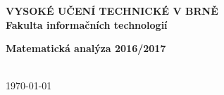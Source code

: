 \begin{titlepage}
	\centering

	{\fontsize{20pt}{15pt}\bfseries 
		VYSOKÉ UČENÍ TECHNICKÉ V BRNĚ\\
		\vspace{8pt}
		Fakulta informačních technologií
	}

	\vspace*{64pt}

	\begin{figure}[H]
		\centering
		 
	\end{figure}

	\vspace*{\fill}

	{\LARGE \bfseries Matematická analýza 2016/2017\\}
	\vspace*{4pt}
	{\Large \thetitle}

	\vspace*{64pt}

	{\Large \theauthor\\}
	\vspace*{64pt}
	{\Large \today}

\end{titlepage}